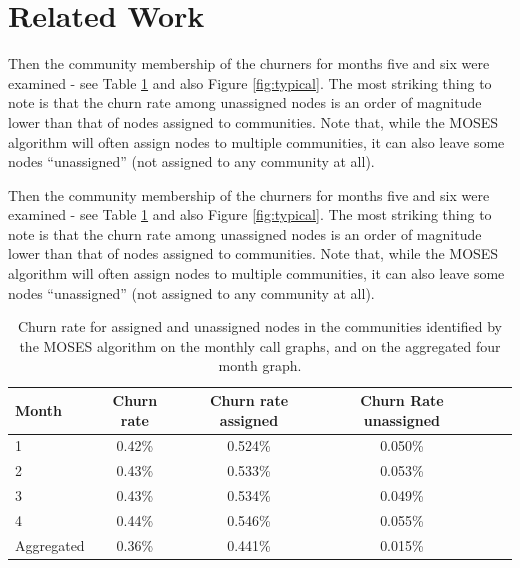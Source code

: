 
\section{Related Work} \label{sec:related}

Then the community membership of the churners for months five and six were examined - see Table \ref{tab:rate1} and also Figure \ref{fig:typical}. The most striking thing to note is that the churn rate among unassigned nodes is an order of magnitude lower than that of nodes assigned to communities. 
Note that, while the MOSES algorithm will often assign nodes to multiple communities, it can also leave some nodes ``unassigned'' (\ie not assigned to any community at all).


Then the community membership of the churners for months five and six were examined - see Table \ref{tab:rate1} and also Figure \ref{fig:typical}. The most striking thing to note is that the churn rate among unassigned nodes is an order of magnitude lower than that of nodes assigned to communities. 
Note that, while the MOSES algorithm will often assign nodes to multiple communities, it can also leave some nodes ``unassigned'' (\ie not assigned to any community at all).

\begin{table}[!h]
\centering
\begin{tabular}{ l c | c c c c } 
Month \;\; & Churn rate & Churn rate assigned & Churn Rate unassigned \\
\hline 
1 & 0.42\% & 0.524\% & 0.050\% \\ 
2 & 0.43\% & 0.533\% & 0.053\%  \\ 
3 & 0.43\% & 0.534\% & 0.049\%  \\ 
4 & 0.44\% &  0.546\%  & 0.055\% \\
Aggregated & 0.36\% &  0.441\%  & 0.015\%  \\
\end{tabular}
\caption{Churn rate for assigned and unassigned nodes in the communities identified by the MOSES algorithm on the monthly call graphs, and on the aggregated four month graph.}
\label{tab:rate1}
\end{table}